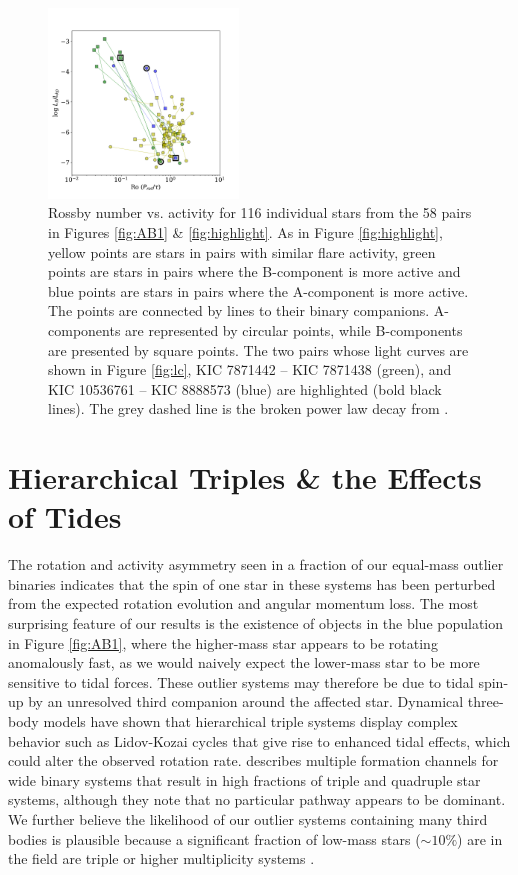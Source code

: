 \documentclass[preprint2]{aastex61}
\begin{document}
\begin{figure}[!ht]
\centering
\includegraphics[width=0.45\textwidth]{GBYrot}
\caption{Rossby number vs. activity for 116 individual stars from the 58 pairs in Figures \ref{fig:AB1} \& \ref{fig:highlight}. As in Figure \ref{fig:highlight}, yellow points are stars in pairs with similar flare activity, green points are stars in pairs where the B-component is more active and blue points are stars in pairs where the A-component is more active. The points are connected by lines to their binary companions. A-components are represented by circular points, while B-components are presented by square points. The two pairs whose light curves are shown in Figure \ref{fig:lc}, KIC 7871442 -- KIC 7871438 (green), and KIC 10536761 -- KIC 8888573 (blue) are highlighted (bold black lines). The grey dashed line is the broken power law decay from \citet{davenport2016}. 
}
\label{fig:rotation}
\end{figure}





\section{Hierarchical Triples \& the Effects of Tides}
\label{sec:triples}

The rotation and activity asymmetry seen in a fraction of our equal-mass outlier binaries indicates that the spin of one star in these systems has been perturbed from the expected rotation evolution and angular momentum loss. The most surprising feature of our results is the existence of objects in the blue population in Figure \ref{fig:AB1}, where the higher-mass star appears to be rotating anomalously fast, as we would naively expect the lower-mass star to be more sensitive to tidal forces. These outlier systems may therefore be due to tidal spin-up by an unresolved third companion around the affected star. Dynamical three-body models \citep[e.g.][]{toonen2016} have shown that hierarchical triple systems display complex behavior such as Lidov-Kozai cycles that give rise to enhanced tidal effects, which could alter the observed rotation rate. \citet{dhital2015} describes multiple formation channels for wide binary systems that result in high fractions of triple and quadruple star systems, although they note that no particular pathway appears to be dominant. We further believe the likelihood of our outlier systems containing many third bodies is plausible because a significant fraction of low-mass stars ($\sim10\%$) are in the field are triple or higher multiplicity systems \citep{tokovinin2008}. 
\end{document}
